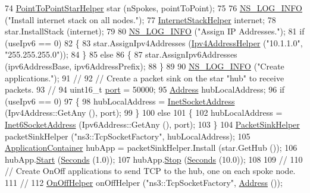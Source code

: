 \begin{DoxyCode}
74   \hyperlink{classns3_1_1PointToPointStarHelper}{PointToPointStarHelper} star (nSpokes, pointToPoint);
75 
76   \hyperlink{group__logging_gafbd73ee2cf9f26b319f49086d8e860fb}{NS\_LOG\_INFO} (\textcolor{stringliteral}{"Install internet stack on all nodes."});
77   \hyperlink{classns3_1_1InternetStackHelper}{InternetStackHelper} internet;
78   star.InstallStack (internet);
79 
80   \hyperlink{group__logging_gafbd73ee2cf9f26b319f49086d8e860fb}{NS\_LOG\_INFO} (\textcolor{stringliteral}{"Assign IP Addresses."});
81   \textcolor{keywordflow}{if} (useIpv6 == 0)
82     \{
83       star.AssignIpv4Addresses (\hyperlink{classns3_1_1Ipv4AddressHelper}{Ipv4AddressHelper} (\textcolor{stringliteral}{"10.1.1.0"}, \textcolor{stringliteral}{"255.255.255.0"}));
84     \}
85   \textcolor{keywordflow}{else}
86     \{
87       star.AssignIpv6Addresses (ipv6AddressBase, ipv6AddressPrefix);
88     \}
89 
90   \hyperlink{group__logging_gafbd73ee2cf9f26b319f49086d8e860fb}{NS\_LOG\_INFO} (\textcolor{stringliteral}{"Create applications."});
91   \textcolor{comment}{//}
92   \textcolor{comment}{// Create a packet sink on the star "hub" to receive packets.}
93   \textcolor{comment}{// }
94   uint16\_t \hyperlink{dsdv-manet_8cc_a8e0798404bf2cf5dabb84c5ba9a4f236}{port} = 50000;
95   \hyperlink{classns3_1_1Address}{Address} hubLocalAddress;
96   \textcolor{keywordflow}{if} (useIpv6 == 0)
97     \{
98       hubLocalAddress = \hyperlink{classns3_1_1InetSocketAddress}{InetSocketAddress} (Ipv4Address::GetAny (), port);
99     \}
100   \textcolor{keywordflow}{else}
101     \{
102       hubLocalAddress = \hyperlink{classns3_1_1Inet6SocketAddress}{Inet6SocketAddress} (Ipv6Address::GetAny (), port);
103     \}
104   \hyperlink{classns3_1_1PacketSinkHelper}{PacketSinkHelper} packetSinkHelper (\textcolor{stringliteral}{"ns3::TcpSocketFactory"}, hubLocalAddress);
105   \hyperlink{classns3_1_1ApplicationContainer}{ApplicationContainer} hubApp = packetSinkHelper.Install (star.GetHub ());
106   hubApp.\hyperlink{classns3_1_1ApplicationContainer_a8eff87926507020bbe3e1390358a54a7}{Start} (\hyperlink{group__timecivil_ga33c34b816f8ff6628e33d5c8e9713b9e}{Seconds} (1.0));
107   hubApp.\hyperlink{classns3_1_1ApplicationContainer_adfc52f9aa4020c8714679b00bbb9ddb3}{Stop} (\hyperlink{group__timecivil_ga33c34b816f8ff6628e33d5c8e9713b9e}{Seconds} (10.0));
108 
109   \textcolor{comment}{//}
110   \textcolor{comment}{// Create OnOff applications to send TCP to the hub, one on each spoke node.}
111   \textcolor{comment}{//}
112   \hyperlink{classns3_1_1OnOffHelper}{OnOffHelper} onOffHelper (\textcolor{stringliteral}{"ns3::TcpSocketFactory"}, \hyperlink{classns3_1_1Address}{Address} ());

\end{DoxyCode}
